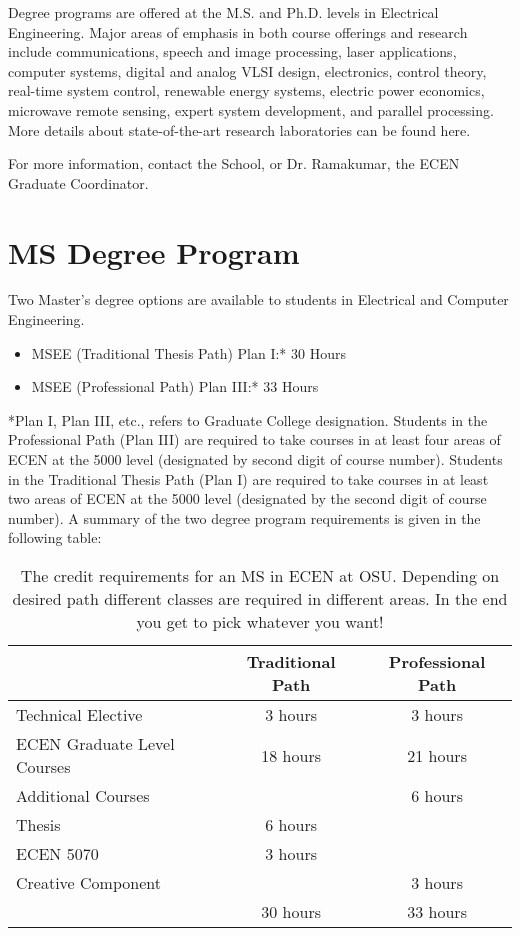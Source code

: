 
Degree programs are offered at the M.S. and Ph.D. levels in Electrical Engineering. Major areas of emphasis in both course offerings and research include communications, speech and image processing, laser applications, computer systems, digital and analog VLSI design, electronics, control theory, real-time system control, renewable energy systems, electric power economics, microwave remote sensing, expert system development, and parallel processing. More details about state-of-the-art research laboratories can be found here.

For more information, contact the School, or Dr. Ramakumar, the ECEN Graduate Coordinator.


\section{MS Degree Program}
Two Master's degree options are available to students in Electrical and Computer Engineering.

\begin{itemize}
\item MSEE (Traditional Thesis Path)  Plan I:*    30 Hours
\item MSEE (Professional Path)    Plan III:*  33 Hours
\end{itemize}

*Plan I, Plan III, etc., refers to Graduate College designation.
Students in the Professional Path (Plan III) are required to take courses in at least four areas of ECEN at the 5000 level (designated by second digit of course number). Students in the Traditional Thesis Path (Plan I) are required to take courses in at least two areas of ECEN at the 5000 level (designated by the second digit of course number). A summary of the two degree program requirements is given in the following table:

\begin{table}
    \centering
    \caption[ECEN MS Requirements]{The credit requirements for an MS in ECEN at OSU. Depending on desired path different classes are required in different areas. In the end you get to pick whatever you want!}
    \begin{tabular}{l c c}
        & Traditional Path & Professional Path \\
        \hline \hline
        Technical Elective          & 3 hours   & 3 hours  \\
        ECEN Graduate Level Courses & 18 hours  & 21 hours \\
        Additional Courses          &           & 6 hours  \\
        Thesis                      & 6 hours   &          \\
        ECEN 5070                   & 3 hours   &          \\
        Creative Component          &           & 3 hours  \\
        \hline
                                    & 30 hours  & 33 hours \\
    \end{tabular}
\end{table}

